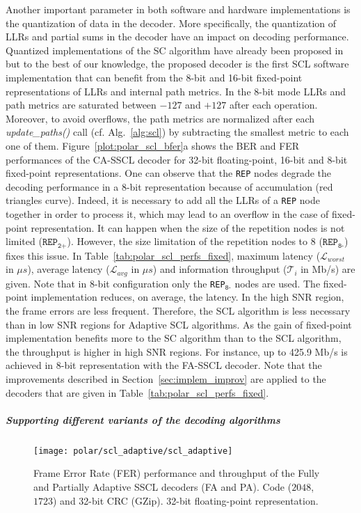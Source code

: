 Another important parameter in both software and hardware implementations is the
quantization of data in the decoder. More specifically, the quantization of LLRs
and partial sums in the decoder have an impact on decoding performance.
Quantized implementations of the SC algorithm have already been proposed
in~\cite{Giard2016} but to the best of our knowledge, the proposed decoder is
the first SCL software implementation that can benefit from the 8-bit and 16-bit
fixed-point representations of LLRs and internal path metrics. In the 8-bit mode
LLRs and path metrics are saturated between $-127$ and $+127$ after each
operation. Moreover, to avoid overflows, the path metrics are normalized after
each \textit{update\_paths()} call (cf. Alg.~\ref{alg:scl}) by subtracting the
smallest metric to each one of them. Figure~\ref{plot:polar_scl_bfer}a shows the
BER and FER performances of the CA-SSCL decoder for 32-bit floating-point,
16-bit and 8-bit fixed-point representations. One can observe that the
\texttt{REP} nodes degrade the decoding performance in a 8-bit representation
because of accumulation (red triangles curve). Indeed, it is necessary to add
all the LLRs of a \texttt{REP} node together in order to process it, which may
lead to an overflow in the case of fixed-point representation. It can happen
when the size of the repetition nodes is not limited
($\texttt{REP}_\texttt{2+}$). However, the size limitation of the repetition
nodes to 8 ($\texttt{REP}_\texttt{8-}$) fixes this issue. In
Table~\ref{tab:polar_scl_perfs_fixed}, maximum latency ($\mathcal{L}_{worst}$ in
$\mu s$), average latency ($\mathcal{L}_{avg}$ in $\mu s$) and information
throughput ($\mathcal{T}_i$ in Mb/s) are given. Note that in 8-bit configuration
only the \texttt{REP}$_{\texttt{8-}}$ nodes are used. The fixed-point
implementation reduces, on average, the latency. In the high SNR region, the
frame errors are less frequent. Therefore, the SCL algorithm is less necessary
than in low SNR regions for Adaptive SCL algorithms. As the gain of fixed-point
implementation benefits more to the SC algorithm than to the SCL algorithm, the
throughput is higher in high SNR regions. For instance, up to 425.9 Mb/s is
achieved in 8-bit representation with the FA-SSCL decoder. Note that the
improvements described in Section~\ref{sec:implem_improv} are applied to the
decoders that are given in Table~\ref{tab:polar_scl_perfs_fixed}.

\subparagraph{Supporting different variants of the decoding algorithms}

\begin{figure}[t]
  \centering
  \texttt{[image: polar/scl\_adaptive/scl\_adaptive]}
  \caption{Frame Error Rate (FER) performance and throughput of the Fully and
    Partially Adaptive SSCL decoders (FA and PA). Code ($2048$,$1723$) and
    32-bit CRC (GZip). 32-bit floating-point representation.}
  \label{plot:polar_scl_adaptive}
\end{figure}

